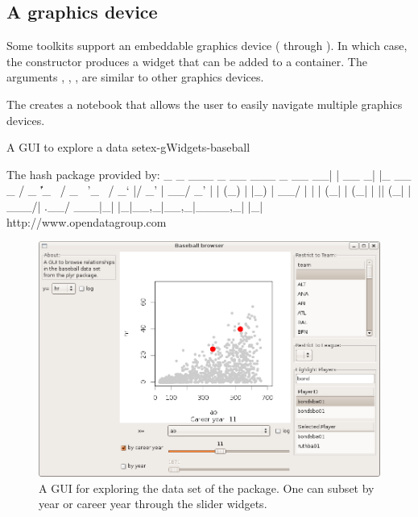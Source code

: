 \subsection{A graphics device}
\label{sec:gWidgets-graphics-device}

Some toolkits support an embeddable graphics device (
through ). In which case, the 
constructor produces a widget that can be added to a container. The
arguments , ,
,  are similar to
other graphics devices.

The  creates a notebook that allows the
user to easily navigate multiple graphics devices.


\begin{example}{A GUI to explore a data set}{ex-gWidgets-baseball}
\begin{Schunk}
\begin{Soutput}
The  hash  package provided by:
                            _       _        
  ___  _ __   ___ _ __   __| | __ _| |_ __ _ 
 / _ \| '_ \ / _ \ '_ \ / _` |/ _' | __/ _' |
| (_) | |_) |  __/ | | | (_| | (_| | || (_| |
 \___/| .__/ \___|_| |_|\__,_|\__,_|\__\__,_|
      |_|   http://www.opendatagroup.com      
\end{Soutput}
\end{Schunk}

\begin{figure}
  \centering
  \includegraphics[width=.8\textwidth]{fig-gWidgets-baseball-gui.png}
  \caption{A  GUI for exploring the  data set of the  package. One can subset by year or career year through the slider widgets.}
  \label{fig:ex-gWidgets-baseball}
\end{figure}


\end{example}
